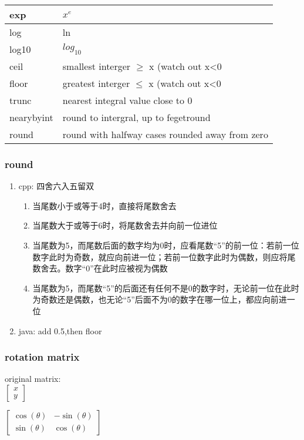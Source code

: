 \begin{tabular}{|l|l|}
\hline
exp & $x^e$\\
\hline
log & ln\\
\hline
log10 & $log_{10}$\\
\hline
ceil & smallest interger $\geq$ x (watch out x<0\\
\hline
floor & greatest interger $\leq$ x (watch out x<0\\
\hline
trunc & nearest integral value close to 0\\
\hline
nearybyint & round to intergral, up to fegetround\\
\hline
round & round with halfway cases rounded away from zero\\
\hline
\end{tabular}

\subsubsection{round}
\begin{enumerate}
\item cpp:  四舍六入五留双
\begin{enumerate}
\item 当尾数小于或等于4时，直接将尾数舍去
\item 当尾数大于或等于6时，将尾数舍去并向前一位进位
\item 当尾数为5，而尾数后面的数字均为0时，应看尾数“5”的前一位：若前一位数字此时为奇数，就应向前进一位；若前一位数字此时为偶数，则应将尾数舍去。数字“0”在此时应被视为偶数
\item 当尾数为5，而尾数“5”的后面还有任何不是0的数字时，无论前一位在此时为奇数还是偶数，也无论“5”后面不为0的数字在哪一位上，都应向前进一位
\end{enumerate}
\item java: add 0.5,then floor
\end{enumerate}

\subsubsection{rotation matrix}
original matrix:\\
$\begin{bmatrix}
x\\
y
\end{bmatrix}$

$\begin{bmatrix}
\cos(\theta) & -\sin(\theta) \\
\sin(\theta) & \cos(\theta)
\end{bmatrix}$

